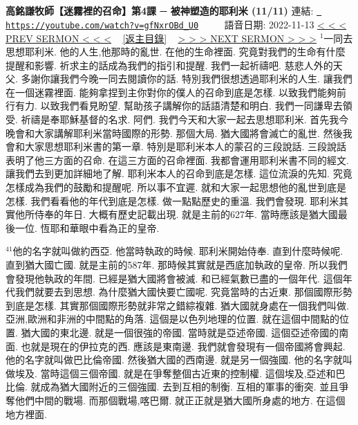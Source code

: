\documentclass{book}
\begin{document}
\section{}
\label{sec:gfNxrOBd_U0}
\textbf{高銘謙牧師【迷霧裡的召命】第4課 ─ 被神塑造的耶利米 (11/11)}
\newline
\newline
連結: \href{https://youtube.com/watch?v=gfNxrOBd_U0}{\texttt{ https://youtube.com/watch?v=gfNxrOBd\_U0}} ~~~~ 語音日期: 2022-11-13 
\newline
\newline
\hyperref[sec:H4gdcVXwfVM]{\small{< < < PREV SERMON < < <}}
~
\hyperref[sec:index]{\small{[返主目錄]}}
~
\hyperref[sec:FHx_k0UyGMs]{\small{> > > NEXT SERMON > > >}}
\newline
\newline
$^{1}$一同去思想耶利米.
他的人生,他那時的亂世.
在他的生命裡面.
究竟對我們的生命有什麼提醒和影響.
祈求主的話成為我們的指引和提醒.
我們一起祈禱吧.
慈悲人外的天父.
多謝你讓我們今晚一同去閱讀你的話.
特別我們很想透過耶利米的人生.
讓我們在一個迷霧裡面.
能夠拿捏到主你對你的僕人的召命到底是怎樣.
以致我們能夠前行有力.
以致我們看見盼望.
幫助孩子講解你的話語清楚和明白.
我們一同謙卑去領受.
祈禱是奉耶穌基督的名求.
阿們.
我們今天和大家一起去思想耶利米.
首先我今晚會和大家講解耶利米當時國際的形勢.
那個大局.
猶大國將會滅亡的亂世.
然後我會和大家思想耶利米書的第一章.
特別是耶利米本人的蒙召的三段說話.
三段說話表明了他三方面的召命.
在這三方面的召命裡面.
我都會運用耶利米書不同的經文.
讓我們去到更加詳細地了解.
耶利米本人的召命到底是怎樣.
這位流淚的先知.
究竟怎樣成為我們的鼓勵和提醒呢.
所以事不宜遲.
就和大家一起思想他的亂世到底是怎樣.
我們看看他的年代到底是怎樣.
做一點點歷史的重溫.
我們會發現.
耶利米其實他所侍奉的年日.
大概有歷史記載出現.
就是主前的627年.
當時應該是猶大國最後一位.
恆耶和華眼中看為正的皇帝.

$^{41}$他的名字就叫做約西亞.
他當時執政的時候.
耶利米開始侍奉.
直到什麼時候呢.
直到猶大國亡國.
就是主前的587年.
那時候其實就是西底加執政的皇帝.
所以我們會發現他執政的年間.
已經是猶大國將會被滅.
和已經氣數已盡的一個年代.
這個年代我們就要去到思想.
為什麼猶大國快要亡國呢.
究竟當時的古近東.
那個國際形勢到底是怎樣.
其實那個國際形勢就非常之錯綜複雜.
猶大國就身處在一個我們叫做.
亞洲,歐洲和非洲的中間點的角落.
這個是以色列地理的位置.
就在這個中間點的位置.
猶大國的東北邊.
就是一個很強的帝國.
當時就是亞述帝國.
這個亞述帝國的南面.
也就是現在的伊拉克的西.
應該是東南邊.
我們就會發現有一個帝國將會興起.
他的名字就叫做巴比倫帝國.
然後猶大國的西南邊.
就是另一個強國.
他的名字就叫做埃及.
當時這個三個帝國.
就是在爭奪整個古近東的控制權.
這個埃及,亞述和巴比倫.
就成為猶大國附近的三個強國.
去到互相的制衡.
互相的軍事的衝突.
並且爭奪他們中間的戰場.
而那個戰場,喀巴爾.
就正正就是猶大國所身處的地方.
在這個地方裡面.
\end{document}
